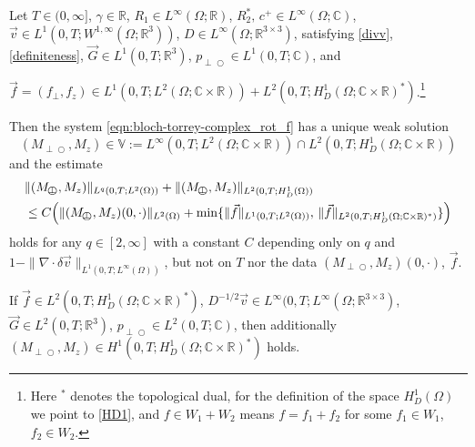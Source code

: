 \documentclass{ws-m3as}
\def\Mpp{M_{\perp\!\!\!\!\!\bigcirc}}
\def\pp{p_{\perp\!\!\!\!\!\bigcirc}}
\newcommand{\revision}[1]{{ #1}}
\newcommand{\Margin}[1]{}
\begin{document}
\begin{proposition}\label{prop:wellposed}
Let $T\in(0,\infty]$, $\gamma\in\mathbb{R}$, 
$R_1\in L^\infty(\Omega;\mathbb{R})$, $R_2^*,\, c^+\in L^\infty(\Omega;\mathbb{C})$, 
$\vec v\in L^1(0,T;W^{1,\infty}(\Omega;\mathbb{R}^3))$, 
$D\in L^\infty(\Omega;\mathbb{R}^{3\times 3})$, 
satisfying \eqref{divv}, \eqref{definiteness},
$\vec G\in L^1(0,T;\mathbb{R}^3)$, 
$\pp\in L^1(0,T;\mathbb{C})$, 
and 
\Margin{R2 6)}
$\revision{\vec{f}=(f_\perp,f_z)}\in L^1(0,T;L^2(\Omega;\mathbb{C}\times\mathbb{R}))+L^2(0,T;H_D^1(\Omega;\mathbb{C}\times\mathbb{R})^*)$.\footnote{Here ${}^*$ denotes the topological dual, for the definition of the space $H_D^1(\Omega)$ we point to \eqref{HD1}, and $f\in W_1+W_2$ means $f=f_1+f_2$ for some $f_1\in W_1$, $f_2\in W_2$.} 

Then the system 
\eqref{eqn:bloch-torrey-complex_rot_f}
has a unique weak solution
\begin{equation}\label{V_wellposed}
(\Mpp,M_z)\in \mathbb{V}:=L^\infty(0,T;L^2(\Omega;\mathbb{C}\times\mathbb{R}))\cap L^2(0,T;H_D^1(\Omega;\mathbb{C}\times\mathbb{R}))
\end{equation}
and the estimate 
\begin{equation}\label{enest_thm}
\begin{aligned}
&\|(\Mpp,M_z)\|_{L^q(0,T;L^2(\Omega))}
+\|(\Mpp,M_z)\|_{L^2(0,T;H_D^1(\Omega))}\\
&\leq C\Bigl(\|(\Mpp,M_z)(0, \cdot)\|_{L^2(\Omega)} + \min\{\|\revision{\vec{f}}\|_{L^1(0,T;L^2(\Omega))}, \,  \|\revision{\vec{f}}\|_{L^2(0,T;H_D^1(\Omega;\mathbb{C}\times\mathbb{R})^*)}\}\Bigr)
\end{aligned}
\end{equation}
holds for any $q\in[2,\infty]$ with a constant 
$C$ depending only on $q$ and $1-\|\nabla\cdot\delta{\vec v}\|_{L^1(0,T;L^\infty(\Omega))}$,
but not on $T$ nor the data $(\Mpp,M_z)(0, \cdot)$, $\revision{\vec{f}}$.

If 
$\revision{\vec{f}}\in L^2(0,T;H_D^1(\Omega;\mathbb{C}\times\mathbb{R})^*)$, 
$D^{-1/2}{\vec v}\in L^\infty(0,T;L^\infty(\Omega;\mathbb{R}^{3\times 3})$, 
$\vec G\in L^2(0,T;\mathbb{R}^3)$,
$\pp\in L^2(0,T;\mathbb{C})$, 
then additionally $(\Mpp,M_z)\in H^1(0,T;H_D^1(\Omega;\mathbb{C}\times\mathbb{R})^*)$ holds.
\end{proposition}
\end{document}
